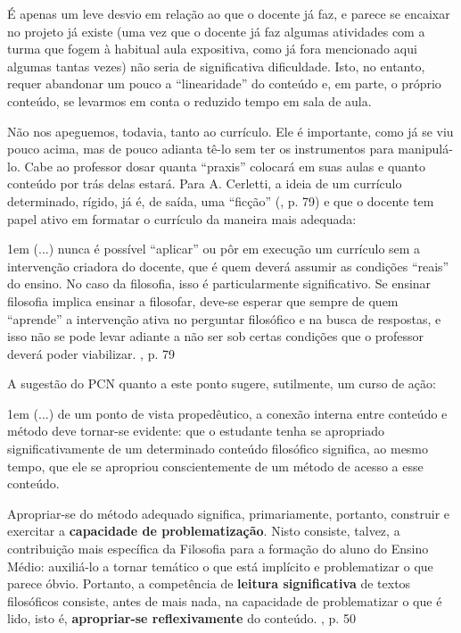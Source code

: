 \documentclass[12pt,a4paper]{article}
\newenvironment{citac}{\begin{addmargin}[4cm]{1em} \footnotesize}{\normalfont \end{addmargin}}
\begin{document}
	É apenas um leve desvio em relação ao que o docente já faz, e parece 
	se encaixar no projeto já existe (uma vez que o docente já faz algumas 
	atividades com a turma que fogem à habitual aula expositiva, como já 
	fora mencionado aqui algumas tantas vezes) não seria de significativa 
	dificuldade. Isto, no entanto, requer abandonar um pouco a ``linearidade'' 
	do conteúdo e, em parte, o próprio conteúdo, se levarmos em conta o 
	reduzido tempo em sala de aula. 
	
	Não nos apeguemos, todavia, tanto ao currículo. Ele é importante, como 
	já se viu pouco acima, mas de pouco adianta tê-lo sem ter os 
	instrumentos para manipulá-lo. Cabe ao professor dosar quanta ``praxis'' 
	colocará em suas aulas e quanto conteúdo por trás delas estará. 	
	Para A. Cerletti, a ideia de um currículo determinado, rígido, já é, 
	de saída, uma ``ficção'' (\cite{cerletti}, p. 79) e que o docente tem 
	papel ativo em formatar o currículo da maneira mais adequada: 
	
	\begin{citac}
		(...) nunca é possível ``aplicar'' ou pôr em execução um currículo 
		sem a intervenção criadora do docente, que é quem deverá assumir as 
		condições ``reais'' do ensino. No caso da filosofia, isso é 
		particularmente significativo. Se ensinar filosofia implica ensinar 
		a filosofar, deve-se esperar que sempre de quem ``aprende'' a 
		intervenção ativa no perguntar filosófico e na busca de respostas, e 
		isso não se pode levar adiante a não ser sob certas condições que o 
		professor deverá poder viabilizar. \cite{cerletti}, p. 79
	\end{citac}
	
	A sugestão do PCN quanto a este ponto sugere, sutilmente, um curso de 
	ação: 
	
	\begin{citac}
	(...) de um ponto de vista propedêutico, a conexão interna entre conteúdo e método deve tornar-se evidente: que o estudante tenha se apropriado significativamente de um determinado conteúdo filosófico significa, ao mesmo tempo, que ele se apropriou conscientemente de um método de acesso a esse conteúdo.  
	
		Apropriar-se do método adequado significa, primariamente, portanto, construir e exercitar a \textbf{capacidade de problematização}. Nisto consiste, talvez, a contribuição mais específica da Filosofia para a formação do aluno do Ensino Médio: auxiliá-lo a tornar temático o que está implícito   e   problematizar   o   que   parece   óbvio.   Portanto,   a   competência   de   \textbf{leitura significativa}   de   textos   filosóficos   consiste,   antes   de   mais   nada,   na   capacidade   de   problematizar o que é lido, isto é, \textbf{apropriar-se reflexivamente} do conteúdo. 
		\cite{pcn}, p. 50
	\end{citac} 
	
\end{document}
